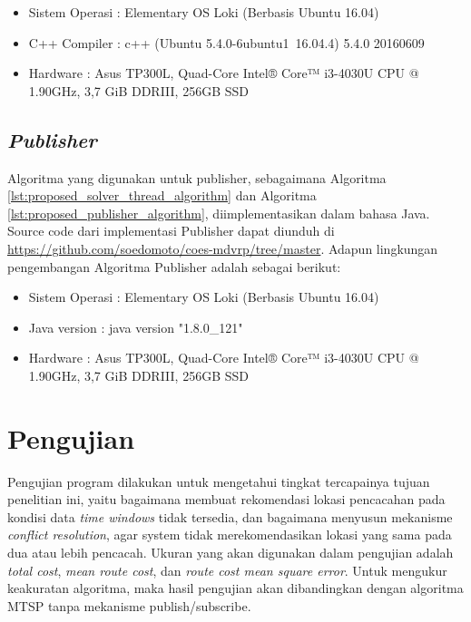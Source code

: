 \begin{itemize}
\item Sistem Operasi		: Elementary OS Loki (Berbasis Ubuntu 16.04)
\item C++ Compiler			: c++ (Ubuntu 5.4.0-6ubuntu1~16.04.4) 5.4.0 20160609
\item Hardware				: Asus TP300L, Quad-Core Intel® Core™ i3-4030U CPU @ 1.90GHz, 3,7 GiB DDRIII, 256GB SSD
\end{itemize}


\subsection{\textit{Publisher}}
Algoritma yang digunakan untuk publisher, sebagaimana Algoritma \ref{lst:proposed_solver_thread_algorithm} dan Algoritma \ref{lst:proposed_publisher_algorithm}, diimplementasikan dalam bahasa Java. Source code dari implementasi Publisher dapat diunduh di \url{https://github.com/soedomoto/coes-mdvrp/tree/master}. Adapun lingkungan pengembangan Algoritma Publisher adalah sebagai berikut:


\begin{itemize}
\item Sistem Operasi		: Elementary OS Loki (Berbasis Ubuntu 16.04)
\item Java version			: java version "1.8.0\_121"
\item Hardware				: Asus TP300L, Quad-Core Intel® Core™ i3-4030U CPU @ 1.90GHz, 3,7 GiB DDRIII, 256GB SSD
\end{itemize}


\section{Pengujian}
\label{sec:testing}
Pengujian program dilakukan untuk mengetahui tingkat tercapainya tujuan penelitian ini, yaitu bagaimana membuat rekomendasi lokasi pencacahan pada kondisi data \textit{time windows} tidak tersedia, dan bagaimana menyusun mekanisme \textit{conflict resolution}, agar system tidak merekomendasikan lokasi yang sama pada dua atau lebih pencacah. Ukuran yang akan digunakan dalam pengujian adalah \textit{total cost}, \textit{mean route cost}, dan \textit{route cost mean square error}. Untuk mengukur keakuratan algoritma, maka hasil pengujian akan dibandingkan dengan algoritma MTSP tanpa mekanisme publish/subscribe.


